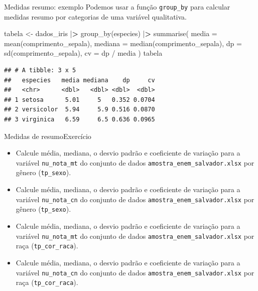\documentclass[
  10pt,
  ignorenonframetext,
]{beamer}
\newenvironment{Shaded}{}{}
\newcommand{\DataTypeTok}[1]{#1}
\newcommand{\ErrorTok}[1]{\textcolor[rgb]{1.00,0.00,0.00}{\textbf{#1}}}
\newcommand{\KeywordTok}[1]{\textcolor[rgb]{0.00,0.00,1.00}{#1}}
\newcommand{\NormalTok}[1]{#1}
\newcommand{\OperatorTok}[1]{#1}
\newcommand{\StringTok}[1]{\textcolor[rgb]{0.00,0.50,0.50}{#1}}
\providecommand{\tightlist}{%
  \setlength{\itemsep}{0pt}\setlength{\parskip}{0pt}}
\begin{document}
\begin{frame}[fragile]{Medidas resumo: exemplo}
\protect\hypertarget{medidas-resumo-exemplo-1}{}
Podemos usar a função \texttt{group\_by} para calcular medidas resumo
por categorias de uma variável qualitativa.

\begin{Shaded}
\begin{Highlighting}[]
\NormalTok{tabela \textless{}{-}}\StringTok{ }\NormalTok{dados\_iris }\OperatorTok{|}\ErrorTok{\textgreater{}}
\StringTok{  }\KeywordTok{group\_by}\NormalTok{(especies) }\OperatorTok{|}\ErrorTok{\textgreater{}}
\StringTok{  }\KeywordTok{summarise}\NormalTok{(}
    \DataTypeTok{media =} \KeywordTok{mean}\NormalTok{(comprimento\_sepala),}
    \DataTypeTok{mediana =} \KeywordTok{median}\NormalTok{(comprimento\_sepala),}
    \DataTypeTok{dp =} \KeywordTok{sd}\NormalTok{(comprimento\_sepala),}
    \DataTypeTok{cv =}\NormalTok{ dp }\OperatorTok{/}\StringTok{ }\NormalTok{media}
\NormalTok{  )}
\NormalTok{tabela}
\end{Highlighting}
\end{Shaded}

\begin{verbatim}
## # A tibble: 3 x 5
##   especies   media mediana    dp     cv
##   <chr>      <dbl>   <dbl> <dbl>  <dbl>
## 1 setosa      5.01     5   0.352 0.0704
## 2 versicolor  5.94     5.9 0.516 0.0870
## 3 virginica   6.59     6.5 0.636 0.0965
\end{verbatim}
\end{frame}

\begin{frame}[fragile]{Medidas de resumo\newline Exercício}
\protect\hypertarget{medidas-de-resumoexercuxedcio}{}
\begin{itemize}
\tightlist
\item
  Calcule média, mediana, o desvio padrão e coeficiente de variação para
  a variável \texttt{nu\_nota\_mt} do conjunto de dados
  \texttt{amostra\_enem\_salvador.xlsx} por gênero (\texttt{tp\_sexo}).
\item
  Calcule média, mediana, o desvio padrão e coeficiente de variação para
  a variável \texttt{nu\_nota\_cn} do conjunto de dados
  \texttt{amostra\_enem\_salvador.xlsx} por gênero (\texttt{tp\_sexo}).
\item
  Calcule média, mediana, o desvio padrão e coeficiente de variação para
  a variável \texttt{nu\_nota\_mt} do conjunto de dados
  \texttt{amostra\_enem\_salvador.xlsx} por raça
  (\texttt{tp\_cor\_raca}).
\item
  Calcule média, mediana, o desvio padrão e coeficiente de variação para
  a variável \texttt{nu\_nota\_cn} do conjunto de dados
  \texttt{amostra\_enem\_salvador.xlsx} por raça
  (\texttt{tp\_cor\_raca}).
\end{itemize}
\end{frame}
\end{document}
